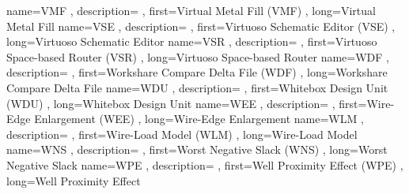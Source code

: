 { name={VMF}
, description={}
, first={Virtual Metal Fill (VMF)}
, long={Virtual Metal Fill}
}
{ name={VSE}
, description={}
, first={Virtuoso Schematic Editor (VSE)}
, long={Virtuoso Schematic Editor}
}
{ name={VSR}
, description={}
, first={Virtuoso Space-based Router (VSR)}
, long={Virtuoso Space-based Router}
}
{ name={WDF}
, description={}
, first={Workshare Compare Delta File (WDF)}
, long={Workshare Compare Delta File}
}
{ name={WDU}
, description={}
, first={Whitebox Design Unit (WDU)}
, long={Whitebox Design Unit}
}
{ name={WEE}
, description={}
, first={Wire-Edge Enlargement (WEE)}
, long={Wire-Edge Enlargement}
}
{ name={WLM}
, description={}
, first={Wire-Load Model (WLM)}
, long={Wire-Load Model}
}
{ name={WNS}
, description={}
, first={Worst Negative Slack (WNS)}
, long={Worst Negative Slack}
}
{ name={WPE}
, description={}
, first={Well Proximity Effect (WPE)}
, long={Well Proximity Effect}
}
